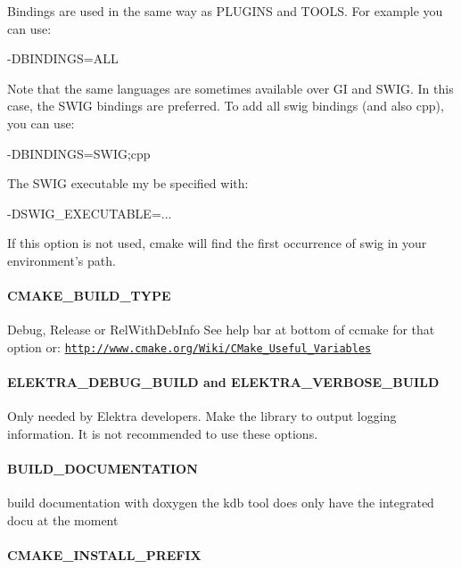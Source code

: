 Bindings are used in the same way as P\+L\+U\+G\+I\+N\+S and T\+O\+O\+L\+S. For example you can use\+: \begin{DoxyVerb}    -DBINDINGS=ALL
\end{DoxyVerb}


Note that the same languages are sometimes available over G\+I and S\+W\+I\+G. In this case, the S\+W\+I\+G bindings are preferred. To add all swig bindings (and also cpp), you can use\+: \begin{DoxyVerb}    -DBINDINGS=SWIG;cpp
\end{DoxyVerb}


The S\+W\+I\+G executable my be specified with\+: \begin{DoxyVerb}    -DSWIG_EXECUTABLE=...
\end{DoxyVerb}


If this option is not used, cmake will find the first occurrence of {\ttfamily swig} in your environment's path.

\paragraph*{C\+M\+A\+K\+E\+\_\+\+B\+U\+I\+L\+D\+\_\+\+T\+Y\+P\+E}

Debug, Release or Rel\+With\+Deb\+Info See help bar at bottom of ccmake for that option or\+: \href{http://www.cmake.org/Wiki/CMake_Useful_Variables}{\tt http\+://www.\+cmake.\+org/\+Wiki/\+C\+Make\+\_\+\+Useful\+\_\+\+Variables}

\paragraph*{E\+L\+E\+K\+T\+R\+A\+\_\+\+D\+E\+B\+U\+G\+\_\+\+B\+U\+I\+L\+D and E\+L\+E\+K\+T\+R\+A\+\_\+\+V\+E\+R\+B\+O\+S\+E\+\_\+\+B\+U\+I\+L\+D}

Only needed by Elektra developers. Make the library to output logging information. It is not recommended to use these options.

\paragraph*{B\+U\+I\+L\+D\+\_\+\+D\+O\+C\+U\+M\+E\+N\+T\+A\+T\+I\+O\+N}

build documentation with doxygen the kdb tool does only have the integrated docu at the moment

\paragraph*{C\+M\+A\+K\+E\+\_\+\+I\+N\+S\+T\+A\+L\+L\+\_\+\+P\+R\+E\+F\+I\+X}

